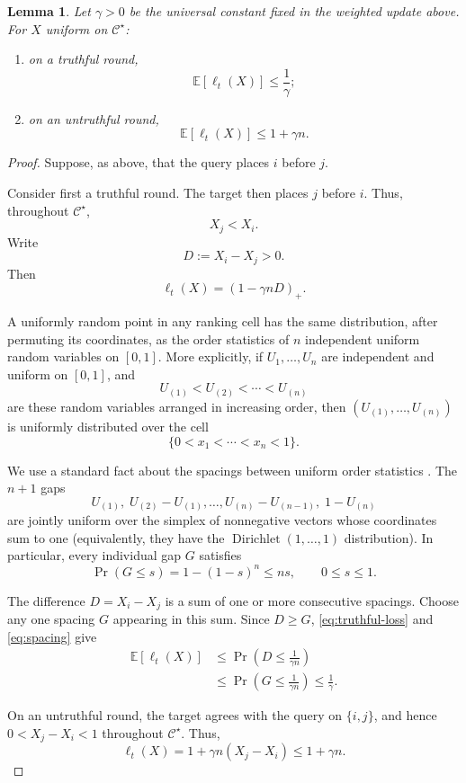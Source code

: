 \documentclass[11pt]{article}
\newtheorem{lemma}[theorem]{Lemma}
\theoremstyle{definition}
\theoremstyle{remark}
\begin{document}
\begin{lemma}
\label{lem:target-loss}
Let $\gamma>0$ be the universal constant fixed in the weighted update above.
For $X$ uniform on $\mathcal C^\star$:
\begin{enumerate}[label=(\roman*)]
    \item on a truthful round,
    \[
        \mathbb E[\ell_t(X)]\leq\frac1\gamma;
    \]
    \item on an untruthful round,
    \[
        \mathbb E[\ell_t(X)]\leq 1+\gamma n.
    \]
\end{enumerate}
\end{lemma}
\begin{proof}
Suppose, as above, that the query places $i$ before $j$.

Consider first a truthful round. The target then places $j$ before $i$.
Thus, throughout $\mathcal C^\star$,
\[
    X_j<X_i.
\]
Write
\[
    D:=X_i-X_j>0.
\]
Then
\[
    \ell_t(X)=(1-\gamma nD)_+.
    \tag{4}\label{eq:truthful-loss}
\]

A uniformly random point in any ranking cell has the same distribution,
after permuting its coordinates, as the order statistics of $n$ independent
uniform random variables on $[0,1]$. More explicitly, if
$U_1,\ldots,U_n$ are independent and uniform on $[0,1]$, and
\[
    U_{(1)}<U_{(2)}<\cdots<U_{(n)}
\]
are these random variables arranged in increasing order, then
$(U_{(1)},\ldots,U_{(n)})$ is uniformly distributed over the cell
\[
    \{0<x_1<\cdots<x_n<1\}.
\]

We use a standard fact about the spacings between uniform order statistics
\cite{Pyke1965}. The $n+1$ gaps
\[
    U_{(1)},\;
    U_{(2)}-U_{(1)},\ldots,
    U_{(n)}-U_{(n-1)},\;
    1-U_{(n)}
\]
are jointly uniform over the simplex of nonnegative vectors whose
coordinates sum to one (equivalently, they have the
$\operatorname{Dirichlet}(1,\ldots,1)$ distribution). In particular, every
individual gap $G$ satisfies
\[
    \Pr(G\leq s)
    =
    1-(1-s)^n
    \leq ns,
    \qquad 0\leq s\leq1.
    \tag{5}\label{eq:spacing}
\]

The difference $D=X_i-X_j$ is a sum of one or more consecutive spacings.
Choose any one spacing $G$ appearing in this sum. Since $D\geq G$,
\eqref{eq:truthful-loss} and \eqref{eq:spacing} give
\begin{align*}
    \mathbb E[\ell_t(X)]
    &\leq
    \Pr\left(D\leq\frac1{\gamma n}\right)\\
    &\leq
    \Pr\left(G\leq\frac1{\gamma n}\right)
    \leq\frac1\gamma.
\end{align*}

On an untruthful round, the target agrees with the query on $\{i,j\}$, and
hence $0<X_j-X_i<1$ throughout $\mathcal C^\star$. Thus,
\[
    \ell_t(X)
    =
    1+\gamma n(X_j-X_i)
    \leq 1+\gamma n.
\]
\end{proof}
\end{document}
